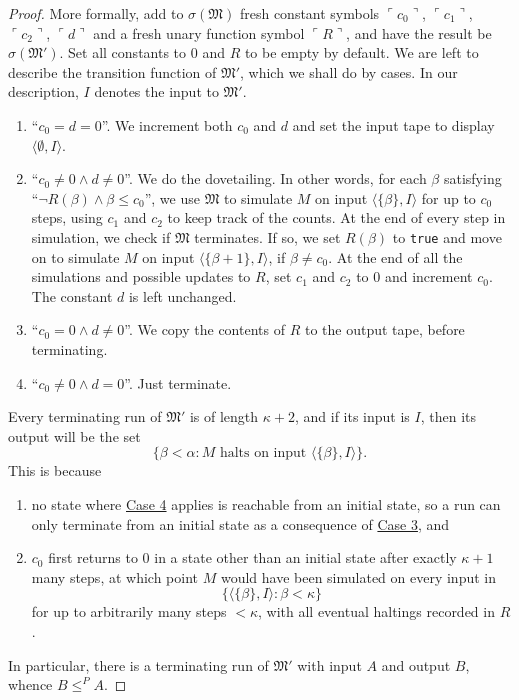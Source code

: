 \documentclass[12pt]{article}
\numberwithin{equation}{section}
\begin{document}
\begin{proof}
More formally, add to $\sigma(\mathfrak{M})$ fresh constant symbols $\ulcorner c_0 \urcorner$, $\ulcorner c_1 \urcorner$, $\ulcorner c_2 \urcorner$, $\ulcorner d \urcorner$ and a fresh unary function symbol $\ulcorner R \urcorner$, and have the result be $\sigma(\mathfrak{M}')$. Set all constants to $0$ and $R$ to be empty by default. We are left to describe the transition function of $\mathfrak{M}'$, which we shall do by cases. In our description, $I$ denotes the input to $\mathfrak{M}'$.
\begin{enumerate}[leftmargin=60pt, label=Case \arabic*:]
    \item ``$c_0 = d = 0$''. We increment both $c_0$ and $d$ and set the input tape to display $\langle \emptyset, I \rangle$.
    \item ``$c_0 \neq 0 \wedge d \neq 0$''. We do the dovetailing. In other words, for each $\beta$ satisfying ``$\neg R(\beta) \wedge \beta \leq c_0$'', we use $\mathfrak{M}$ to simulate $M$ on input $\langle \{\beta\}, I \rangle$ for up to $c_0$ steps, using $c_1$ and $c_2$ to keep track of the counts. At the end of every step in simulation, we check if $\mathfrak{M}$ terminates. If so, we set $R(\beta)$ to \texttt{true} and move on to simulate $M$ on input $\langle \{\beta + 1\}, I \rangle$, if $\beta \neq c_0$. At the end of all the simulations and possible updates to $R$, set $c_1$ and $c_2$ to $0$ and increment $c_0$. The constant $d$ is left unchanged.
    \item\label{8340c3} ``$c_0 = 0 \wedge d \neq 0$''. We copy the contents of $R$ to the output tape, before terminating.
    \item\label{8340c4} ``$c_0 \neq 0 \wedge d = 0$''. Just terminate.
\end{enumerate}
Every terminating run of $\mathfrak{M}'$ is of length $\kappa + 2$, and if its input is $I$, then its output will be the set
\begin{equation*}
    \{\beta < \alpha : M \text{ halts on input } \langle \{\beta\}, I \rangle\} \text{.}
\end{equation*}This is because
\begin{enumerate}[label=(\arabic*)]
    \item no state where \hyperref[8340c4]{Case 4} applies is reachable from an initial state, so a run can only terminate from an initial state as a consequence of \hyperref[8340c3]{Case 3}, and
    \item $c_0$ first returns to $0$ in a state other than an initial state after exactly $\kappa + 1$ many steps, at which point $M$ would have been simulated on every input in 
    \begin{equation*}
        \{\langle \{\beta\}, I \rangle : \beta < \kappa\}
    \end{equation*}
    for up to arbitrarily many steps $< \kappa$, with all eventual haltings recorded in $R$.
\end{enumerate}
In particular, there is a terminating run of $\mathfrak{M}'$ with input $A$ and output $B$, whence $B \leq^P A$.
\end{proof}
\end{document}
